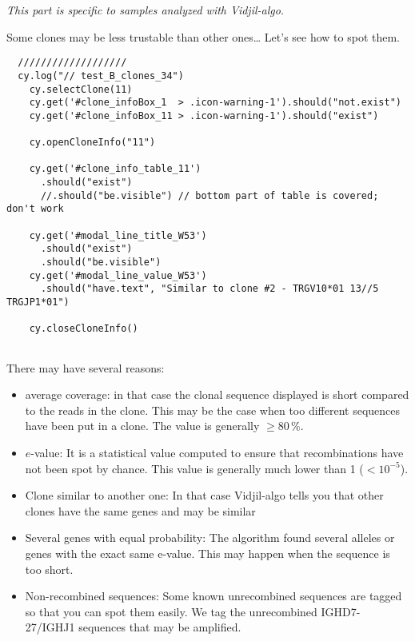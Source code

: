 \bigskip

\textit{This part is specific to samples analyzed with Vidjil-algo.}

Some clones may be less trustable than other ones\dots{} Let's see how to spot them.
\begin{verbatim}
  ///////////////////
  cy.log("// test_B_clones_34")
    cy.selectClone(11)
    cy.get('#clone_infoBox_1  > .icon-warning-1').should("not.exist")
    cy.get('#clone_infoBox_11 > .icon-warning-1').should("exist")

    cy.openCloneInfo("11")

    cy.get('#clone_info_table_11')
      .should("exist")
      //.should("be.visible") // bottom part of table is covered; don't work

    cy.get('#modal_line_title_W53')
      .should("exist")
      .should("be.visible")
    cy.get('#modal_line_value_W53')
      .should("have.text", "Similar to clone #2 - TRGV10*01 13//5 TRGJP1*01")

    cy.closeCloneInfo()


\end{verbatim}

There may have several reasons: 
\begin{itemize}
\item average coverage: in that case the clonal sequence displayed is short
  compared to the reads in the clone. This may be the case when too different
  sequences have been put in a clone. The value is generally $\geq 80\,\%$.
\item $e$-value: It is a statistical value computed to ensure that
  recombinations have not been spot by chance. This value is generally much
  lower than 1 ($<10^{-5}$).
\item Clone similar to another one: In that case Vidjil-algo tells you that
  other clones have the same genes and may be similar
\item Several genes with equal probability: The algorithm found several alleles or genes with the exact same e-value. This may happen when the sequence is too short.
\item Non-recombined sequences: Some known unrecombined sequences are tagged
  so that you can spot them easily. We tag the unrecombined IGHD7-27/IGHJ1
  sequences that may be amplified.
\end{itemize}

